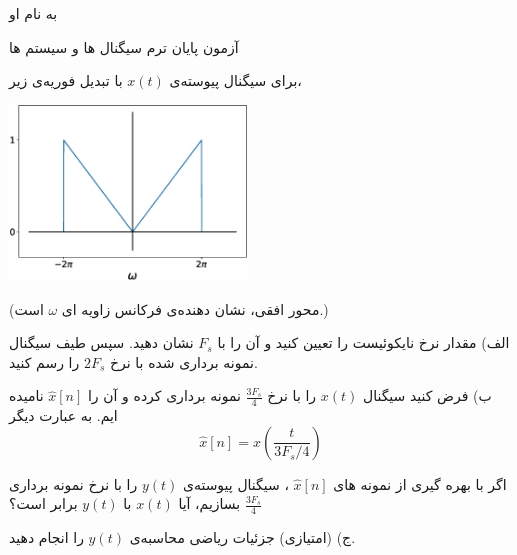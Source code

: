 \documentclass{article}
\begin{document}
\begin{center}
\large

به نام او

آزمون پایان ترم سیگنال ها و سیستم ها
\end{center}

\hrulefill

\large


برای سیگنال پیوسته‌ی
$
x(t)
$
با تبدیل فوریه‌ی زیر،

\begin{center}
\includegraphics[width=63mm]{X(jw).eps}
\end{center}

(محور افقی، نشان دهنده‌ی فرکانس زاویه ای $\omega$ است.)

الف) مقدار نرخ نایکوئیست را تعیین کنید و آن را با $F_s$ نشان دهید. سپس طیف سیگنال نمونه برداری شده با نرخ $2F_s$ را رسم کنید.

ب) فرض کنید سیگنال $x(t)$ را با نرخ 
$
\frac{3F_s}{4}
$
نمونه برداری کرده و آن را 
$
\hat x[n]
$
نامیده ایم. به عبارت دیگر
$$
\hat x[n]=x(\frac{t}{3F_s/4})
$$

اگر با بهره گیری از نمونه های 
$
\hat x[n]
$
، سیگنال پیوسته‌ی $y(t)$ را با نرخ نمونه برداری 
$
\frac{3F_s}{4}
$
بسازیم، آیا 
$
x(t)
$
با 
$
y(t)
$
برابر است؟

ج) (امتیازی) جزئیات ریاضی محاسبه‌ی $y(t)$ را انجام دهید.

\end{document}
